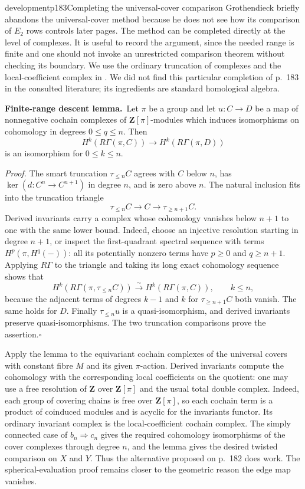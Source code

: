 \begin{dcomment}{development}{p183}{Completing the universal-cover comparison}
Grothendieck briefly abandons the universal-cover method because he does not see how its comparison of $E_2$ rows controls later pages. The method can be completed directly at the level of complexes. It is useful to record the argument, since the needed range is finite and one should not invoke an unrestricted comparison theorem without checking its boundary. We use the ordinary truncation of complexes and the local-coefficient complex in \citet[\S3H]{Hatcher2002}. We did not find this particular completion of p.~183 in the consulted literature; its ingredients are standard homological algebra.

\textbf{Finite-range descent lemma.}\ours\ Let $\pi$ be a group and let $u:C\to D$ be a map of nonnegative cochain complexes of $\mathbf Z[\pi]$-modules which induces isomorphisms on cohomology in degrees $0\leq q\leq n$. Then
\[
 H^k(R\Gamma(\pi,C))\longrightarrow
 H^k(R\Gamma(\pi,D))
\]
is an isomorphism for $0\leq k\leq n$.

\textit{Proof.} The smart truncation $\tau_{\leq n}C$ agrees with $C$ below $n$, has $\ker(d:C^n\to C^{n+1})$ in degree $n$, and is zero above $n$. The natural inclusion fits into the truncation triangle
\[
 \tau_{\leq n}C\longrightarrow C\longrightarrow\tau_{\geq n+1}C.
\]
Derived invariants carry a complex whose cohomology vanishes below $n+1$ to one with the same lower bound. Indeed, choose an injective resolution starting in degree $n+1$, or inspect the first-quadrant spectral sequence with terms $H^p(\pi,H^q(-))$: all its potentially nonzero terms have $p\geq0$ and $q\geq n+1$. Applying $R\Gamma$ to the triangle and taking its long exact cohomology sequence shows that
\[
 H^k(R\Gamma(\pi,\tau_{\leq n}C))
 \xrightarrow{\sim}H^k(R\Gamma(\pi,C)),\qquad k\leq n,
\]
because the adjacent terms of degrees $k-1$ and $k$ for $\tau_{\geq n+1}C$ both vanish. The same holds for $D$. Finally $\tau_{\leq n}u$ is a quasi-isomorphism, and derived invariants preserve quasi-isomorphisms. The two truncation comparisons prove the assertion.\hfill$\square$

Apply the lemma to the equivariant cochain complexes of the universal covers with constant fibre $M$ and its given $\pi$-action. Derived invariants compute the cohomology with the corresponding local coefficients on the quotient: one may use a free resolution of $\mathbf Z$ over $\mathbf Z[\pi]$ and the usual total double complex. Indeed, each group of covering chains is free over $\mathbf Z[\pi]$, so each cochain term is a product of coinduced modules and is acyclic for the invariants functor. Its ordinary invariant complex is the local-coefficient cochain complex. The simply connected case of $b_n\Rightarrow c_n$ gives the required cohomology isomorphisms of the cover complexes through degree $n$, and the lemma gives the desired twisted comparison on $X$ and $Y$. Thus the alternative proposed on p.~182 does work. The spherical-evaluation proof remains closer to the geometric reason the edge map vanishes.
\end{dcomment}

